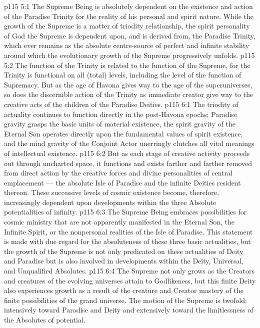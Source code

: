 \vs p115 5:1 The Supreme Being is absolutely dependent on the existence and action of the Paradise Trinity for the reality of his personal and spirit nature. While the growth of the Supreme is a matter of triodity relationship, the spirit personality of God the Supreme is dependent upon, and is derived from, the Paradise Trinity, which ever remains as the absolute centre\hyp{}source of perfect and infinite stability around which the evolutionary growth of the Supreme progressively unfolds.
\vs p115 5:2 The function of the Trinity is related to the function of the Supreme, for the Trinity is functional on all (total) levels, including the level of the function of Supremacy. But as the age of Havona gives way to the age of the superuniverses, so does the discernible action of the Trinity as immediate creator give way to the creative acts of the children of the Paradise Deities.
\vs p115 6:1 The triodity of actuality continues to function directly in the post\hyp{}Havona epochs; Paradise gravity grasps the basic units of material existence, the spirit gravity of the Eternal Son operates directly upon the fundamental values of spirit existence, and the mind gravity of the Conjoint Actor unerringly clutches all vital meanings of intellectual existence.
\vs p115 6:2 But as each stage of creative activity proceeds out through uncharted space, it functions and exists farther and farther removed from direct action by the creative forces and divine personalities of central emplacement --- the absolute Isle of Paradise and the infinite Deities resident thereon. These successive levels of cosmic existence become, therefore, increasingly dependent upon developments within the three Absolute potentialities of infinity.
\vs p115 6:3 The Supreme Being embraces possibilities for cosmic ministry that are not apparently manifested in the Eternal Son, the Infinite Spirit, or the nonpersonal realities of the Isle of Paradise. This statement is made with due regard for the absoluteness of these three basic actualities, but the growth of the Supreme is not only predicated on these actualities of Deity and Paradise but is also involved in developments within the Deity, Universal, and Unqualified Absolutes.
\vs p115 6:4 \pc The Supreme not only grows as the Creators and creatures of the evolving universes attain to Godlikeness, but this finite Deity also experiences growth as a result of the creature and Creator mastery of the finite possibilities of the grand universe. The motion of the Supreme is twofold: intensively toward Paradise and Deity and extensively toward the limitlessness of the Absolutes of potential.
